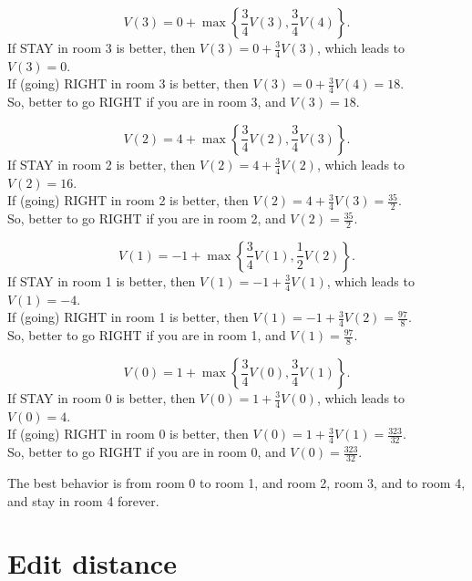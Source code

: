 \documentclass[a4paper, 12pt]{article}
\begin{document}
\begin{equation*}
V(3) = 0 + \max \left\{ \frac{3}{4} V(3), \frac{3}{4} V(4) \right\}.
\end{equation*}
If STAY in room 3 is better, then $V(3) = 0 + \frac{3}{4} V(3)$, which leads to $V(3) = 0$.\\
If (going) RIGHT in room 3 is better, then $V(3) = 0 + \frac{3}{4} V(4) = 18$.\\
So, better to go RIGHT if you are in room 3, and $V(3) = 18$.

\begin{equation*}
V(2) = 4 + \max \left\{ \frac{3}{4} V(2), \frac{3}{4} V(3) \right\}.
\end{equation*}
If STAY in room 2 is better, then $V(2) = 4 + \frac{3}{4} V(2)$, which leads to $V(2) = 16$.\\
If (going) RIGHT in room 2 is better, then $V(2) = 4 + \frac{3}{4} V(3) = \frac{35}{2}$.\\
So, better to go RIGHT if you are in room 2, and $V(2) = \frac{35}{2}$.

\begin{equation*}
V(1) = -1 + \max \left\{ \frac{3}{4} V(1), \frac{1}{2} V(2) \right\}.
\end{equation*}
If STAY in room 1 is better, then $V(1) = -1 + \frac{3}{4} V(1)$, which leads to $V(1) = -4$.\\
If (going) RIGHT in room 1 is better, then $V(1) = -1 + \frac{3}{4} V(2) = \frac{97}{8}$.\\
So, better to go RIGHT if you are in room 1, and $V(1) = \frac{97}{8}$.

\begin{equation*}
V(0) = 1 + \max \left\{ \frac{3}{4} V(0), \frac{3}{4} V(1) \right\}.
\end{equation*}
If STAY in room 0 is better, then $V(0) = 1 + \frac{3}{4} V(0)$, which leads to $V(0) = 4$.\\
If (going) RIGHT in room 0 is better, then $V(0) = 1 + \frac{3}{4} V(1) = \frac{323}{32}$.\\
So, better to go RIGHT if you are in room 0, and $V(0) = \frac{323}{32}$.

The best behavior is from room 0 to room 1, and room 2, room 3, and to room 4, and stay in room 4 forever.

\section{Edit distance}
\end{document}
